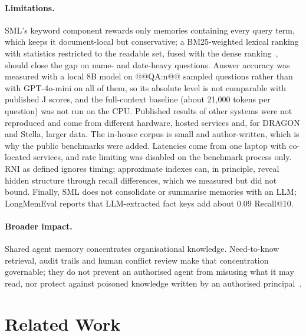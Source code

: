\documentclass[11pt,a4paper]{article}
\theoremstyle{remark}
\newcommand{\sys}{SML}
\begin{document}
\paragraph{Limitations.} \sys{}'s keyword component rewards only memories containing every query term, which keeps it
document-local but conservative; a BM25-weighted lexical ranking with statistics restricted to the readable set, fused with
the dense ranking~\cite{cormack2009rrf}, should close the gap on name- and date-heavy questions. Answer accuracy was
measured with a local 8B model on @@QA:n@@ sampled questions rather than with GPT-4o-mini on all of them, so its absolute
level is not comparable with published J scores, and the full-context baseline (about 21{,}000 tokens per question) was
not run on the CPU. Published results of other systems were not reproduced and come from different hardware, hosted
services and, for DRAGON and Stella, larger data. The in-house corpus is small and author-written, which is why the public
benchmarks were added. Latencies come from one laptop with co-located services, and rate limiting was disabled on the
benchmark process only. RNI as defined ignores timing; approximate indexes can, in principle, reveal hidden structure
through recall differences, which we measured but did not bound. Finally, \sys{} does not consolidate or summarise memories
with an LLM; LongMemEval reports that LLM-extracted fact keys add about 0.09 Recall@10.

\paragraph{Broader impact.} Shared agent memory concentrates organisational knowledge. Need-to-know retrieval, audit
trails and human conflict review make that concentration governable; they do not prevent an authorised agent from
misusing what it may read, nor protect against poisoned knowledge written by an authorised principal~\cite{zou2025poisonedrag}.

\section{Related Work}
\label{sec:related}
\end{document}
